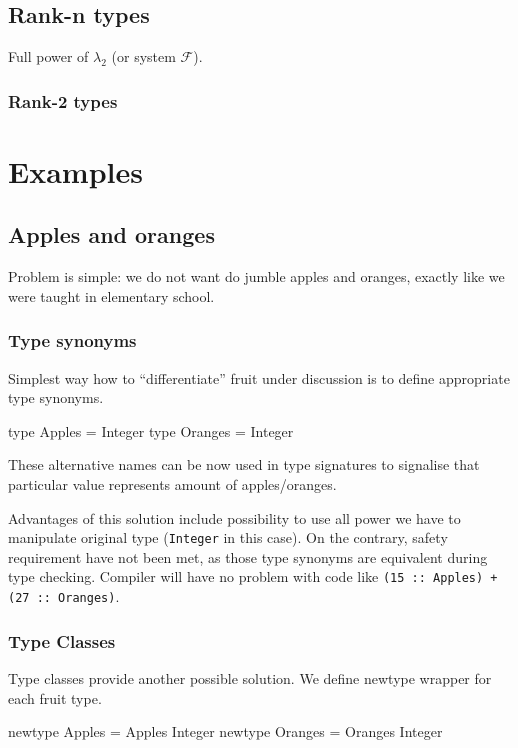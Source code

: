 \documentclass[11pt,oneside,draft]{fithesis2}
\newcommand\uv[1]{``#1''}
\theoremstyle{definition}
\begin{document}
\cite{GADT+Kind=Dep}

\section{Rank-n types}
\label{extension:rankn}

Full power of \(\lambda_2\) (or system \(\mathcal{F}\)).

\subsection{Rank-2 types}

\chapter{Examples}

\section{Apples and oranges}

Problem is simple: we do not want do jumble apples and oranges,
exactly like we were taught in elementary school.

\subsection{Type synonyms}

Simplest way how to \uv{differentiate} fruit under discussion is to define
appropriate type synonyms.
\begin{code}
type Apples  = Integer
type Oranges = Integer
\end{code}
These alternative names can be now used in type signatures to signalise that
particular value represents amount of apples/oranges.

Advantages of this solution include possibility to use all power we have
to manipulate original type (\texttt{Integer} in this case). On the contrary,
safety requirement have not been met, as those type synonyms are equivalent
during type checking. Compiler will have no problem with
code like \texttt{(15 :: Apples) + (27 :: Oranges)}.

\subsection{Type Classes}

Type classes provide another possible solution. We define newtype wrapper
for each fruit type.
\begin{code}
newtype Apples  = Apples  Integer
newtype Oranges = Oranges Integer
\end{code}
\end{document}
